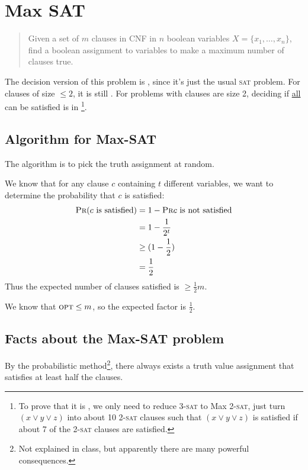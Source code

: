         \chapter{Max SAT} %
        \label{cha:max_sat}
            \begin{quotation}
                Given a set of $m$ clauses in \textsc{CNF} in $n$ boolean variables $X = \{x_1, \ldots, x_n\}$, find a boolean assignment to variables to make a maximum number of clauses true.
            \end{quotation}
            The decision version of this problem is \npcomplete, since it's just the usual \textsc{sat} problem.
            For clauses of size $\le 2$, it is still \npcomplete.
            For problems with clauses are size 2, deciding if \uline{all} can be satisfied is in \p\footnote{To prove that it is \npcomplete, we only need to reduce 3-\textsc{sat} to Max 2-\textsc{sat}, just turn $(x \lor y \lor z)$ into about 10 2-\textsc{sat} clauses such that $(x \lor y \lor z)$ is satisfied if about 7 of the 2-\textsc{sat} clauses are satisfied.}.

            \section{Algorithm for Max-\textsc{SAT}} %
            \label{sec:algorithm_for_max_sat}
                The algorithm is to pick the truth assignment at random.

                We know that for any clause $c$ containing $t$ different variables, we want to determine the probability that $c$ is satisfied:
                \begin{align*}
                    \textsc{Pr}(\text{$c$ is satisfied}) &= 1 - \textsc{Pr}{\text{$c$ is not satisfied}} \\
                    &= 1 - \frac{1}{2^t} \\
                    &\ge (1 - \frac{1}{2}) \\
                    &= \frac{1}{2}
                \end{align*}
                Thus the expected number of clauses satisfied is $\ge \frac{1}{2} m$.

                We know that $\textsc{opt} \le m$, so the expected \appr factor is $\frac{1}{2}$.
            \section{Facts about the Max-\textsc{SAT} problem} %
            \label{sec:facts_about_the_max_sat_problem}
                By the probabilistic method\footnote{Not explained in class, but apparently there are many powerful consequences.}, there always exists a truth value assignment that satisfies at least half the clauses.


